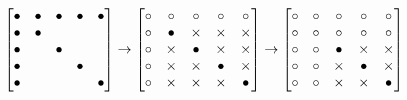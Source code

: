 \documentclass{article}
\begin{document}
\[
\begin{bmatrix}
\bullet & \bullet & \bullet & \bullet & \bullet \\
\bullet & \bullet & \space & \space & \space \\
\bullet & \space & \bullet & \space & \space \\
\bullet & \space & \space & \bullet & \space \\
\bullet & \space & \space & \space & \bullet \\
\end{bmatrix}
\rightarrow
\begin{bmatrix}
\circ & \circ & \circ & \circ & \circ \\
\circ & \bullet & \times & \times & \times \\
\circ & \times & \bullet & \times & \times \\
\circ & \times & \times & \bullet & \times \\
\circ & \times & \times & \times & \bullet \\
\end{bmatrix}
\rightarrow
\begin{bmatrix}
\circ & \circ & \circ & \circ & \circ \\
\circ & \circ & \circ & \circ & \circ \\
\circ & \circ & \bullet & \times & \times \\
\circ & \circ & \times & \bullet & \times \\
\circ & \circ & \times & \times & \bullet \\
\end{bmatrix}
\]
\end{document}
